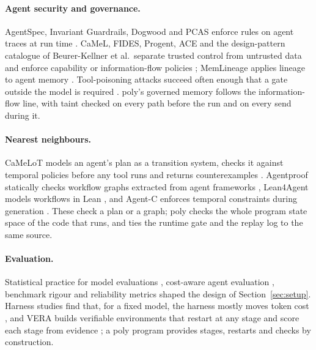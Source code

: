 \documentclass[11pt]{article}
\newcommand{\poly}{\textsf{poly}}
\begin{document}
\paragraph{Agent security and governance.} AgentSpec, Invariant Guardrails, Dogwood and PCAS enforce rules on agent traces at run time \cite{wang2026agentspec,invariantguardrails,dogwood2026,palumbo2026pcas}. CaMeL, FIDES, Progent, ACE and the design-pattern catalogue of Beurer-Kellner et al.\ separate trusted control from untrusted data and enforce capability or information-flow policies \cite{debenedetti2025camel,costa2025fides,shi2025progent,li2026ace,beurerkellner2025patterns}; MemLineage applies lineage to agent memory \cite{ouyang2026memlineage}. Tool-poisoning attacks succeed often enough that a gate outside the model is required \cite{wang2025mcptox}. \poly's governed memory follows the information-flow line, with taint checked on every path before the run and on every send during it.

\paragraph{Nearest neighbours.} CaMeLoT models an agent's plan as a transition system, checks it against temporal policies before any tool runs and returns counterexamples \cite{nikolaou2026camelot}. Agentproof statically checks workflow graphs extracted from agent frameworks \cite{xavier2026agentproof}, Lean4Agent models workflows in Lean \cite{wang2026lean4agent}, and Agent-C enforces temporal constraints during generation \cite{kamath2025agentc}. These check a plan or a graph; \poly{} checks the whole program state space of the code that runs, and ties the runtime gate and the replay log to the same source.

\paragraph{Evaluation.} Statistical practice for model evaluations \cite{miller2024errorbars}, cost-aware agent evaluation \cite{kapoor2024agents}, benchmark rigour \cite{zhu2025abc} and reliability metrics \cite{rabanser2026reliability} shaped the design of Section~\ref{sec:setup}. Harness studies find that, for a fixed model, the harness mostly moves token cost \cite{liuhan2026harness,liu2026solpi}, and VERA builds verifiable environments that restart at any stage and score each stage from evidence \cite{liu2026vera}; a \poly{} program provides stages, restarts and checks by construction.
\end{document}
